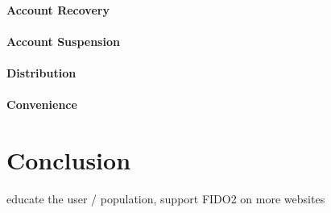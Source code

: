 \documentclass[runningheads]{llncs}
\begin{document}
\paragraph{Account Recovery}
\paragraph{Account Suspension}
\paragraph{Distribution}

\paragraph{Convenience}

\section{Conclusion}
educate the user / population, support FIDO2 on more websites


\end{document}
